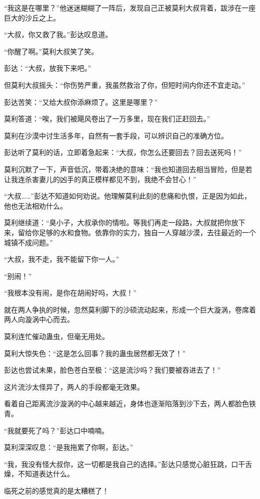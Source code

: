 \begin{this_body}
“我这是在哪里？”他迷迷糊糊了一阵后，发现自己正被莫利大叔背着，跋涉在一座巨大的沙丘之上。

“大叔，你又救了我。”彭达叹息道。

“你醒了啊。”莫利大叔笑了笑。

彭达：“大叔，放我下来吧。”

但莫利大叔摇头：“你伤势严重，我虽然救治了你，但短时间内你还不宜走动。”

彭达苦笑：“又给大叔你添麻烦了。这里是哪里？”

莫利答道：“唉，我们被飓风卷出了一万多里，现在我们正赶回去。”

莫利在沙漠中讨生活多年，自然有一套手段，可以辨识自己的准确方位。

彭达听了莫利的话，立即着急起来：“大叔，你怎么还要回去？回去送死吗！”

莫利沉默了一下，声音低沉，带着决绝的意味：“我也知道回去相当冒险，但是若让我连杀害妻儿的凶手的真正模样都见不到，我绝不会甘心！”

“大叔……”彭达不知道如何劝说。他理解莫利此刻的悲痛和仇恨，正是因为如此，他也无法相劝什么。

莫利继续道：“臭小子，大叔承你的情啦。等我们再走一段路，大叔就把你放下来，留给你足够的水和食物。依靠你的实力，独自一人穿越沙漠，去往最近的一个城镇不成问题。”

“大叔，我不走，我不能留下你一人。”

“别闹！”

“我根本没有闹，是你在胡闹好吗，大叔！”

就在两人争执的时候，忽然莫利脚下的沙硕流动起来，形成一个巨大漩涡，卷席着两人向漩涡中心而去。

莫利连忙催动蛊虫，但毫无用处。

莫利大惊失色：“这是怎么回事？我的蛊虫居然都无效了！”

彭达也尝试未果，脸色苍白至极：“这是流沙吗？我们要被吞进去了！”

这片流沙太怪异了，两人的手段都毫无效果。

看着自己距离流沙漩涡的中心越来越近，身体也逐渐陷落到沙下去，两人都脸色铁青。

“我就要死了吗？”彭达口中喃喃。

莫利深深叹息：“是我拖累了你啊，彭达。”

“我，我没有怪大叔你，这一切都是我自己的选择。”彭达只感觉心脏狂跳，口干舌燥，不知道表达什么。

临死之前的感觉真的是太糟糕了！


\end{this_body}
